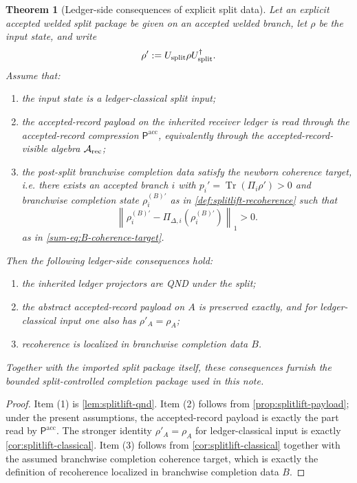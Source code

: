 \documentclass[11pt]{article}
\theoremstyle{definition}
\theoremstyle{plain}
\newtheorem{theorem}[definition]{Theorem}
\theoremstyle{remark}
\newcommand{\Arec}{\mathcal A_{\rm rec}}
\newcommand{\Pacc}{\mathsf P^{\mathrm{acc}}}
\newcommand{\Tr}{\operatorname{Tr}}
\newcommand{\1}{\mathbf 1}
\newcommand{\norm}[1]{\left\lVert #1 \right\rVert}
\begin{document}
\begin{theorem}[Ledger-side consequences of explicit split data]
\label{thm:splitlift-main}
Let an explicit accepted welded split package be given on an accepted welded branch, let \(\rho\) be
the input state, and write
\[
\rho':=U_{\rm split}\rho U_{\rm split}^\dagger.
\]
Assume that:
\begin{enumerate}[leftmargin=2em]
\item the input state is a ledger-classical split input;
\item the accepted-record payload on the inherited receiver ledger is read through the accepted-record
  compression \(\Pacc\), equivalently through the accepted-record-visible algebra \(\Arec\);
\item the post-split branchwise completion data satisfy the newborn coherence target, i.e. there
  exists an accepted branch \(i\) with \(p_i'=\Tr(\Pi_i\rho')>0\) and branchwise completion state
  \(\rho_i^{(B)\prime}\) as in \cref{def:splitlift-recoherence} such that
  \[
  \norm{\rho_i^{(B)\prime}-\Pi_{\Delta,i}(\rho_i^{(B)\prime})}_1>0.
  \]
  as in \eqref{sum-eq:B-coherence-target}.
\end{enumerate}
Then the following ledger-side consequences hold:
\begin{enumerate}[leftmargin=2em]
\item the inherited ledger projectors are QND under the split;
\item the abstract accepted-record payload on \(A\) is preserved exactly, and for ledger-classical
  input one also has \(\rho'_A=\rho_A\);
\item recoherence is localized in branchwise completion data \(B\).
\end{enumerate}
Together with the imported split package itself, these consequences furnish the bounded
split-controlled completion package used in this note.
\end{theorem}

\begin{proof}
Item (1) is \cref{lem:splitlift-qnd}.
Item (2) follows from \cref{prop:splitlift-payload}; under the present assumptions, the
accepted-record payload is exactly the part read by \(\Pacc\).
The stronger identity \(\rho'_A=\rho_A\) for ledger-classical input is exactly
\cref{cor:splitlift-classical}.
Item (3) follows from \cref{cor:splitlift-classical} together with the assumed branchwise
completion coherence target, which is exactly the definition of recoherence localized in branchwise
completion data \(B\).
\end{proof}
\end{document}
